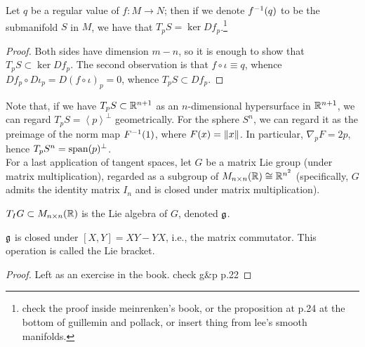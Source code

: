 \begin{claim}[\S5.18]
    Let $q$ be a regular value of $f \colon M \to N$; then if we denote $f^{-1}(q)$ to be the submanifold $S$ in $M$, we have that $T_p S = \ker Df_p$.\footnote{check the proof inside meinrenken's book, or the proposition at p.24 at the bottom of guillemin and pollack, or insert thing from lee's smooth manifolds.}
\end{claim}
\begin{proof}
    Both sides have dimension $m - n$, so it is enough to show that $T_p S \subset \ker Df_p$. The second observation is that $f \circ \iota \equiv q$, whence $Df_p \circ D\iota_p = D(f \circ \iota)_p = 0$, whence $T_p S \subset Df_p$.
\end{proof}
Note that, if we have $T_p S \subset \mathbb R^{n+1}$ as an $n$-dimensional hypersurface in $\mathbb R^{n+1}$, we can regard $T_p S = \left<p\right>^\perp$ geometrically. For the sphere $S^n$, we can regard it as the preimage of the norm map $F^{-1}(1)$, where $F(x) = \left\lVert x \right\rVert$. In particular, $\nabla_p F = 2p$, hence $T_p S^n = \operatorname{span}(p)^\perp$.
\\[8pt]
For a last application of tangent spaces, let $G$ be a matrix Lie group (under matrix multiplication), regarded as a subgroup of $M_{n \times n}(\mathbb R) \cong \mathbb R^{n^2}$ (specifically, $G$ admits the identity matrix $I_n$ and is closed under matrix multiplication).
\begin{definition}
    $T_I G \subset M_{n \times n}(\mathbb R)$ is the Lie algebra of $G$, denoted $\mathfrak g$.
\end{definition}
\begin{fact}
    $\mathfrak g$ is closed under $[X, Y] = XY - YX$, i.e., the matrix commutator. This operation is called the Lie bracket.
\end{fact}
\begin{proof}
    Left as an exercise in the book. check g\&p p.22
\end{proof}